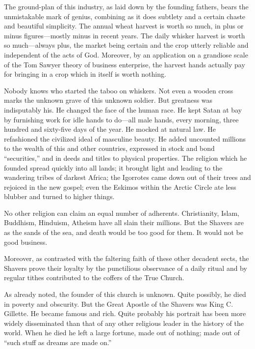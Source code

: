 \documentclass[nohyper,openany,nobib]{tufte-book}
\begin{document}
The ground-plan of this industry, as laid down by the founding fathers,
bears the unmistakable mark of genius, combining as it does subtlety and
a certain chaste and beautiful simplicity. The annual wheat harvest is
worth so much, in plus or minus figures---mostly minus in recent years.
The daily whisker harvest is worth so much---always plus, the market
being certain and the crop utterly reliable and independent of the acts
of God. Moreover, by an application on a grandiose scale of the Tom
Sawyer theory of business enterprise, the harvest hands actually pay for
bringing in a crop which in itself is worth nothing.

Nobody knows who started the taboo on whiskers. Not even a wooden cross
marks the unknown grave of this unknown soldier. But greatness was
indisputably his. He changed the face of the human race. He kept Satan
at bay by furnishing work for idle hands to do---all male hands, every
morning, three hundred and sixty-five days of the year. He mocked at
natural law. He refashioned the civilized ideal of masculine beauty. He
added uncounted millions to the wealth of this and other countries,
expressed in stock and bond ``securities,'' and in deeds and titles to
physical properties. The religion which he founded spread quickly into
all lands; it brought light and leading to the wandering tribes of
darkest Africa; the Igorrotes came down out of their trees and rejoiced
in the new gospel; even the Eskimos within the Arctic Circle ate less
blubber and turned to higher things.

No other religion can claim an equal number of adherents. Christianity,
Islam, Buddhism, Hinduism, Atheism have all slain their millions. But
the Shavers are as the sands of the sea, and death would be too good for
them. It would not be good business.

Moreover, as contrasted with the faltering faith of these other decadent
sects, the Shavers prove their loyalty by the punctilious observance of
a daily ritual and by regular tithes contributed to the coffers of the
True Church.

As already noted, the founder of this church is unknown. Quite possibly,
he died in poverty and obscurity. But the Great Apostle of the Shavers
was King C. Gillette. He became famous and rich. Quite probably his
portrait has been more widely disseminated than that of any other
religious leader in the history of the world. When he died he left a
large fortune, made out of nothing; made out of ``such stuff as dreams
are made on.''
\end{document}
